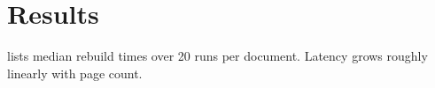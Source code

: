 \section{Results}
\label{sec:results}

 lists median rebuild times over \num{20} runs per document.
Latency grows roughly linearly with page count.


